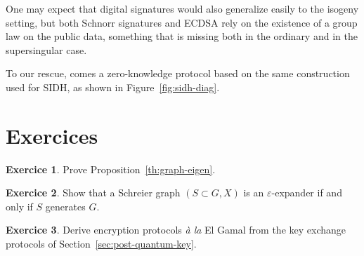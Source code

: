 \documentclass[10pt]{article}
\theoremstyle{plain}
\theoremstyle{definition}
\newtheorem{exercice}{Exercice}[part]
\begin{document}
One may expect that digital signatures would also generalize easily to
the isogeny setting, but both Schnorr signatures and ECDSA rely on the
existence of a group law on the public data, something that is missing
both in the ordinary and in the supersingular case.

To our rescue, comes a zero-knowledge protocol based on the same
construction used for SIDH, as shown in Figure~\ref{fig:sidh-diag}.



\section*{Exercices}

\begin{exercice}
  Prove Proposition~\ref{th:graph-eigen}.
\end{exercice}

\begin{exercice}
  \label{ex:schreier}
  Show that a Schreier graph $(S⊂G, X)$ is an $ε$-expander if and only
  if $S$ generates $G$.
\end{exercice}

\begin{exercice}
  \label{ex:elgamal}
  Derive encryption protocols \emph{\`a la} El Gamal from the key
  exchange protocols of Section~\ref{sec:post-quantum-key}.
\end{exercice}

\clearpage


\end{document}
